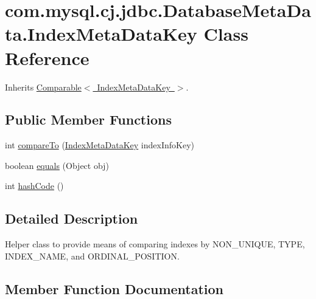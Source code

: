 \hypertarget{classcom_1_1mysql_1_1cj_1_1jdbc_1_1_database_meta_data_1_1_index_meta_data_key}{}\section{com.\+mysql.\+cj.\+jdbc.\+Database\+Meta\+Data.\+Index\+Meta\+Data\+Key Class Reference}
\label{classcom_1_1mysql_1_1cj_1_1jdbc_1_1_database_meta_data_1_1_index_meta_data_key}


Inherits \mbox{\hyperlink{class_comparable}{Comparable$<$ Index\+Meta\+Data\+Key $>$}}.

\subsection*{Public Member Functions}
\begin{DoxyCompactItemize}
\item 
int \mbox{\hyperlink{classcom_1_1mysql_1_1cj_1_1jdbc_1_1_database_meta_data_1_1_index_meta_data_key_a4271d0bf2b328cd07bedb5aa35a84d2e}{compare\+To}} (\mbox{\hyperlink{classcom_1_1mysql_1_1cj_1_1jdbc_1_1_database_meta_data_1_1_index_meta_data_key}{Index\+Meta\+Data\+Key}} index\+Info\+Key)
\item 
boolean \mbox{\hyperlink{classcom_1_1mysql_1_1cj_1_1jdbc_1_1_database_meta_data_1_1_index_meta_data_key_a6f39b445ccd5ebd23703172179164a50}{equals}} (Object obj)
\item 
int \mbox{\hyperlink{classcom_1_1mysql_1_1cj_1_1jdbc_1_1_database_meta_data_1_1_index_meta_data_key_ae3059fb058d0cd9e17592a4a93d88c20}{hash\+Code}} ()
\end{DoxyCompactItemize}


\subsection{Detailed Description}
Helper class to provide means of comparing indexes by N\+O\+N\+\_\+\+U\+N\+I\+Q\+UE, T\+Y\+PE, I\+N\+D\+E\+X\+\_\+\+N\+A\+ME, and O\+R\+D\+I\+N\+A\+L\+\_\+\+P\+O\+S\+I\+T\+I\+ON. 

\subsection{Member Function Documentation}
\mbox{\label{classcom_1_1mysql_1_1cj_1_1jdbc_1_1_database_meta_data_1_1_index_meta_data_key_a4271d0bf2b328cd07bedb5aa35a84d2e}} 
